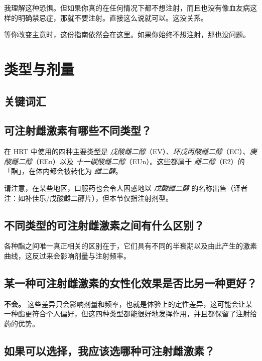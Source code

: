 \documentclass{article}
\begin{document}
我理解这种恐惧。但如果你真的在任何情况下都不想注射，而且也没有像血友病这样的明确禁忌症，那就不要注射。直接这么说就可以。这没关系。

等你改变主意时，这份指南依然会在这里。如果你始终不想注射，那也没问题。

\section{类型与剂量}\label{td}

\subsection*{关键词汇}

\subsection{可注射雌激素有哪些不同类型？}

在 HRT 中使用的四种主要类型是 \textit{戊酸雌二醇}（EV）、\textit{环戊丙酸雌二醇}（EC）、\textit{庚酸雌二醇}（EEn）以及 \textit{十一碳酸雌二醇}（EUn）。这些都属于 \textit{雌二醇}（E2）的「酯」，在体内都会被转化为 \textit{雌二醇}。

请注意，在某些地区，口服药也会令人困惑地以 \textit{戊酸雌二醇} 的名称出售（译者注：如补佳乐/戊酸雌二醇片），但本节仅指注射剂型。

\subsection{不同类型的可注射雌激素之间有什么区别？}

各种酯之间唯一真正相关的区别在于，它们具有不同的半衰期以及由此产生的激素曲线，这反过来会影响剂量与注射频率。

\subsection{某一种可注射雌激素的女性化效果是否比另一种更好？}

\textbf{不会。} 这些差异只会影响剂量和频率，也就是体验上的定性差异，这可能会让某一种酯更符合个人偏好，但这四种类型都能很好地发挥作用，并且都保留了注射给药的优势。

\subsection{如果可以选择，我应该选哪种可注射雌激素？}
\end{document}
